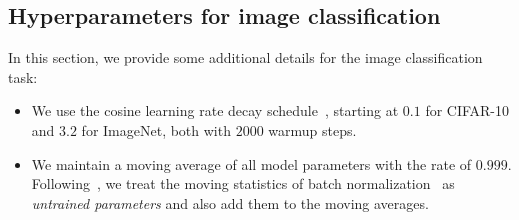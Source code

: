 \subsection{\label{app:image_hparam} Hyperparameters for image classification}
In this section, we provide some additional details for the image classification task:
\begin{itemize}
  \item We use the cosine learning rate decay schedule~\citep{cosine_lr}, starting at $0.1$ for CIFAR-10 and $3.2$ for ImageNet, both with $2000$ warmup steps. 
  \item We maintain a moving average of all model parameters with the rate of $0.999$. Following~\citet{imagenet_generalize_better}, we treat the moving statistics of batch normalization~\citep{batch_norm} as \textit{untrained parameters} and also add them to the moving averages. 
\end{itemize}

